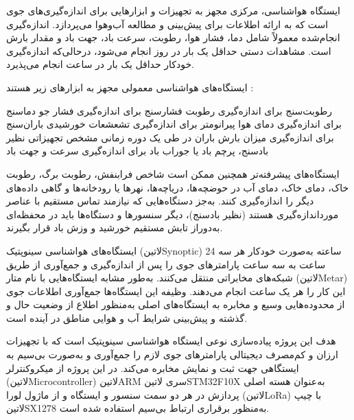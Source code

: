 \begingroup

\titleformat{\section}[display]{\normalfont\huge\bfseries}{}{0pt}{}


ایستگاه هواشناسی، مرکزی مجهز به تجهیزات و ابزارهایی برای اندازه‌گیری‌های جوی است که به ارائه اطلاعات برای پیش‌بینی و مطالعه آب‌وهوا می‌پردازد. اندازه‌گیری انجام‌شده معمولاً شامل دما، فشار هوا، رطوبت، سرعت باد، جهت باد و مقدار بارش است. مشاهدات دستی حداقل یک بار در روز انجام می‌شود، درحالی‌که اندازه‌گیری خودکار حداقل یک بار در ساعت انجام می‌پذیرد.

ایستگاه‌های هواشناسی معمولی مجهز به ابزارهای زیر هستند :

رطوبت‌سنج برای اندازه‌گیری رطوبت
فشارسنج برای اندازه‌گیری فشار جو
دماسنج برای اندازه‌گیری دمای هوا
پیرانومتر برای اندازه‌گیری تشعشعات خورشیدی
باران‌سنج برای اندازه‌گیری میزان بارش باران در طی یک دوره زمانی مشخص
تجهیزاتی نظیر بادسنج، پرچم باد یا جوراب باد برای اندازه‌گیری سرعت و جهت باد

ایستگاه‌های پیشرفته‌تر همچنین ممکن است شاخص فرابنفش، رطوبت برگ، رطوبت خاک، دمای خاک، دمای آب در حوضچه‌ها، دریاچه‌ها، نهرها یا رودخانه‌ها و گاهی داده‌های دیگر را اندازه‌گیری کنند. به‌جز دستگاه‌هایی که نیازمند تماس مستقیم با عناصر مورداندازه‌گیری هستند (نظیر بادسنج)، دیگر سنسورها و دستگاه‌ها باید در محفظه‌ای به‌دوراز تابش مستقیم خورشید و وزش باد قرار بگیرند.

ایستگاه‌های هواشناسی سینوپتیک (‌لاتین{Synoptic}) 24 ساعته به‌صورت خودکار هر سه ساعت به سه ساعت پارامترهای جوی را پس از اندازه‌گیری و جمع‌آوری از طریق شبکه‌های مخابراتی منتقل می‌کنند. به‌طور مشابه ایستگاه‌هایی با نام متار (‌لاتین{Metar}) این کار را هر  یک ساعت انجام می‌دهند. وظیفه این ایستگاه‌ها جمع‌آوری اطلاعات جوی از محدوده‌هایی وسیع و مخابره به ایستگاه‌های اصلی به‌منظور اطلاع از وضعیت حال و گذشته و پیش‌بینی شرایط آب و هوایی مناطق در آینده است. 

هدف این پروژه پیاده‌سازی نوعی ایستگاه هواشناسی سینوپتیک است که با تجهیزات ارزان و کم‌مصرف دیجیتالی پارامترهای جوی لازم را جمع‌آوری و به‌صورت بی‌سیم به ایستگاهی جهت ثبت و نمایش مخابره می‌کند. در این پروژه از میکروکنترلر (‌لاتین{Microcontroller}) ‌لاتین{ARM} سری ‌لاتین{STM32F10X} به‌عنوان هسته اصلی پردازش در هر دو سمت سنسور و ایستگاه و از ماژول لورا (‌لاتین{LoRa}) با چیپ ‌لاتین{SX1278} به‌منظور برقراری ارتباط بی‌سیم استفاده شده ‌است.

\endgroup